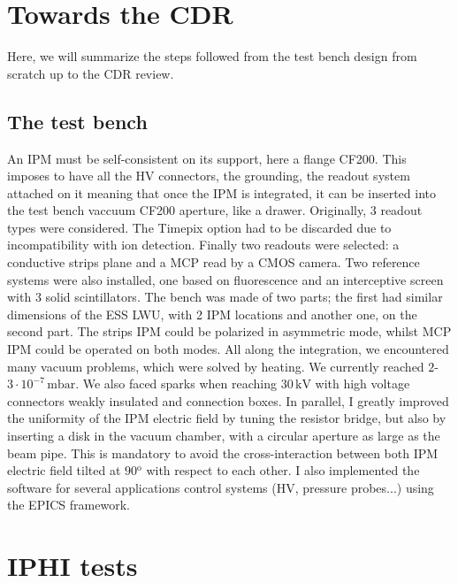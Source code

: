 \section*{Towards the CDR}
Here, we will summarize the steps followed from the test bench design from scratch up to the CDR review.
\subsection*{The test bench}
An IPM must be self-consistent on its support, here a flange CF200. This imposes to have all the HV connectors, the grounding, the readout system attached on it meaning that once the IPM is integrated, it can be inserted into the test bench vaccuum CF200 aperture, like a drawer. Originally, 3 readout types were considered. The Timepix option had to be discarded due to incompatibility with ion detection. Finally two readouts were selected: a conductive strips plane and a MCP read by a CMOS camera. Two reference systems were also installed, one based on fluorescence and an interceptive screen with 3 solid scintillators. The bench was made of two parts; the first had similar dimensions of the ESS LWU, with 2 IPM locations and another one, on the second part.
The strips IPM could be polarized in asymmetric mode, whilst MCP IPM could be operated on both modes. All along the integration, we encountered many vacuum problems, which were solved by heating. We currently reached $2$-$3 \cdot 10^{-7}\,\mathrm{mbar}$.
We also faced sparks when reaching $30\,\mathrm{kV}$ with high voltage connectors weakly insulated and connection boxes. In parallel, I greatly improved the uniformity of the IPM electric field by tuning the resistor bridge, but also by inserting a disk in the vacuum chamber, with a circular aperture as large as the beam pipe. This is mandatory to avoid the cross-interaction between both IPM electric field tilted at $90\mathrm{^{o}}$ with respect to each other.
I also implemented the software for several applications control systems (HV, pressure probes...) using the EPICS framework.

\section*{IPHI tests}

